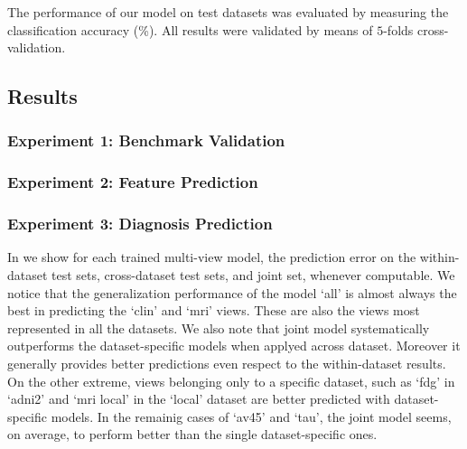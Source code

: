 The performance of our model on test datasets was evaluated by measuring the classification accuracy (\%).
All results were validated by means of $5$-folds cross-validation.

\subsection{Results}
\subsubsection{Experiment 1: Benchmark Validation}
\subsubsection{Experiment 2: Feature Prediction}
\subsubsection{Experiment 3: Diagnosis Prediction}
In  we show for each trained multi-view model, the prediction error on the within-dataset test sets, cross-dataset test sets, and joint set, whenever computable.
We notice that the generalization performance of the model `all' is almost always the best in predicting the `clin' and `mri' views.
These are also the views most represented in all the datasets.
We also note that joint model systematically outperforms the dataset-specific models when applyed across dataset.
Moreover it generally provides better predictions even respect to the within-dataset results.
On the other extreme, views belonging only to a specific dataset, such as `fdg' in `adni2' and `mri local' in the `local' dataset are better predicted with dataset-specific models.
In the remainig cases of `av45' and `tau', the joint model seems, on average, to perform better than the single dataset-specific ones.

